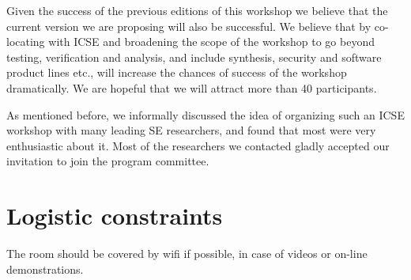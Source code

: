 \documentclass{sig-alternate}
\begin{document}
\vspace{0.2cm} Given the success of the previous editions of this
workshop we believe that the current version we are proposing will
also be successful. We believe that by co-locating with ICSE and
broadening the scope of the workshop to go beyond testing,
verification and analysis, and include synthesis, security and
software product lines etc., will increase the chances of success of
the workshop dramatically. We are hopeful that we will attract more
than 40 participants.

\vspace{0.2cm} As mentioned before, we informally discussed the idea
of organizing such an ICSE workshop with many leading SE researchers,
and found that most were very enthusiastic about it. Most of the
researchers we contacted gladly accepted our invitation to join the
program committee.

\section{Logistic constraints}
\vspace{0.2cm} The room should be covered by wifi if possible, in case
of videos or on-line demonstrations.
\end{document}
